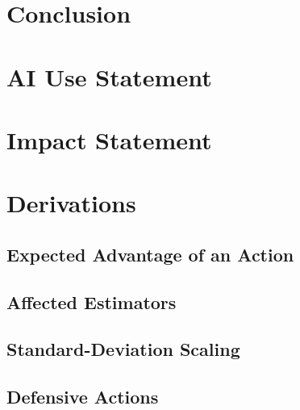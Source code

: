 \documentclass{article}
\theoremstyle{plain}
\theoremstyle{definition}
\begin{document}
\section{Conclusion}
\label{sec:conclusion}

\section*{AI Use Statement}

\section*{Impact Statement}


% 
% 

\newpage
\appendix
\onecolumn

\section{Derivations}
\label{app:derivations}

\subsection{Expected Advantage of an Action}

\subsection{Affected Estimators}

\subsection{Standard-Deviation Scaling}

\subsection{Defensive Actions}
\end{document}
